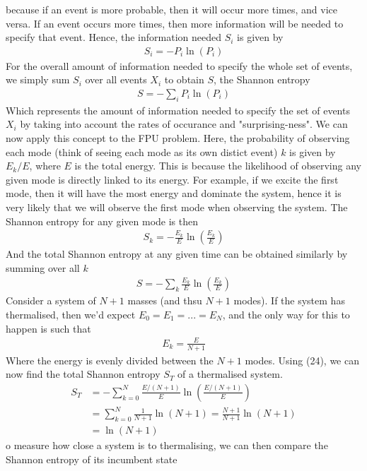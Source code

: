 \documentclass{article}
\begin{document}
because if an event is more probable, then it will occur more times, and vice versa. If 
an event occurs more times, then more information will be needed to specify that event. Hence, 
the information needed $S_i$ is given by 
\begin{align}
    S_i=-P_i\ln(P_i)
\end{align}
For the overall amount of information needed to 
specify the whole set of events, we simply sum $S_i$ over all events $X_i$ to obtain $S$, 
the Shannon entropy 
\begin{align}
    S=-\sum_{i}P_i\ln(P_i)
\end{align}
Which represents the amount of information needed to specify the set of 
events $X_i$ by taking into account 
the rates of occurance and "surprising-ness". We can now apply this concept to the 
FPU problem. Here, the probability of observing each mode 
(think of seeing each mode as its own distict event) $k$ is given by $E_k/E$, where $E$ is the 
total energy. This is because the likelihood
of observing any given mode is directly linked to its energy. For example, 
if we excite the first mode, then it will have the most energy and dominate the system, 
hence it is very likely that we will observe the first mode when observing the system.
The Shannon entropy for any given mode 
is then 
\begin{align}
    S_k=-\frac{E_k}{E}\ln(\frac{E_k}{E})
\end{align}
And the total Shannon entropy at any given time can be obtained similarly by summing over all $k$
\begin{align}
    S=-\sum_k\frac{E_k}{E}\ln(\frac{E_k}{E})
\end{align}
Consider a system of $N+1$ masses (and thsu $N+1$ modes). If the system has thermalised, 
then we'd expect $E_0=E_1=...=E_N$, and 
the only way for this to happen is such that 
\begin{align}
    E_k=\frac{E}{N+1}
\end{align}
Where the energy is evenly divided between the $N+1$ modes. Using (24), 
we can now find the total Shannon entropy $S_T$ of a thermalised system.
\begin{align}
    S_T&=-\sum_{k=0}^N\frac{E/(N+1)}{E}\ln(\frac{E/(N+1)}{E})\\ 
    &=\sum_{k=0}^N\frac{1}{N+1}\ln(N+1) = \frac{N+1}{N+1}\ln(N+1)\\ 
    &= \ln(N+1)
\end{align}
o measure how close a system is to thermalising, we can then compare the Shannon entropy of its incumbent state 
\end{document}
